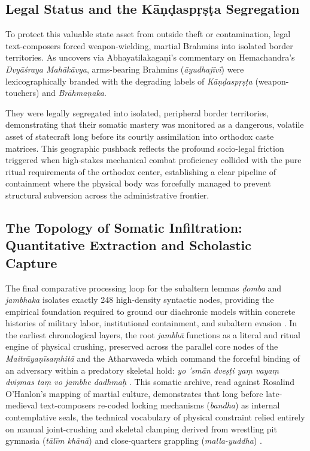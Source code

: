 \documentclass[11pt,twoside,letterpaper]{article}
\begin{document}
\subsection{Legal Status and the K\={a}\d{n}\d{d}asp\d{r}\d{s}\d{t}a Segregation}
To protect this valuable state asset from outside theft or contamination, legal text-composers forced weapon-wielding, martial Brahmins into isolated border territories. As \citet{Sandesara1948} uncovers via Abhayatilakaga\d{n}i’s commentary on Hemachandra’s \textit{Dvy\={a}\'sraya Mah\={a}k\={a}vya}, arms-bearing Brahmins (\textit{\={a}yudhaj\={i}v\={i}}) were lexicographically branded with the degrading labels of \textit{K\={a}\d{n}\d{d}asp\d{r}\d{s}\d{t}a} (weapon-touchers) and \textit{Br\={a}hma\d{n}aka}. 

They were legally segregated into isolated, peripheral border territories, demonstrating that their somatic mastery was monitored as a dangerous, volatile asset of statecraft long before its courtly assimilation into orthodox caste matrices. This geographic pushback reflects the profound socio-legal friction triggered when high-stakes mechanical combat proficiency collided with the pure ritual requirements of the orthodox center, establishing a clear pipeline of containment where the physical body was forcefully managed to prevent structural subversion across the administrative frontier.

\subsection{The Topology of Somatic Infiltration: Quantitative Extraction and Scholastic Capture}
The final comparative processing loop for the subaltern lemmas \textit{\d{d}omba} and \textit{jambhaka} isolates exactly 248 high-density syntactic nodes, providing the empirical foundation required to ground our diachronic models within concrete histories of military labor, institutional containment, and subaltern evasion \citep{Lorenzen1978, McCartneyForthcomingDomingA}. In the earliest chronological layers, the root \textit{jambh\={a}} functions as a literal and ritual engine of physical crushing, preserved across the parallel core nodes of the \textit{Maitr\={a}ya\d{n}\={i}sa\d{m}hit\={a}} and the Atharvaveda which command the forceful binding of an adversary within a predatory skeletal hold: \textit{yo ’sm\={a}n dve\d{s}\d{t}i ya\d{m} vaya\d{m} dvi\d{s}mas ta\d{m} vo jambhe dadhma\d{h}} \citep{McCartneyForthcomingDomingB}. This somatic archive, read against Rosalind O’Hanlon’s mapping of martial culture, demonstrates that long before late-medieval text-composers re-coded locking mechanisms (\textit{bandha}) as internal contemplative seals, the technical vocabulary of physical constraint relied entirely on manual joint-crushing and skeletal clamping derived from wrestling pit gymnasia (\textit{t\={a}l\={i}m kh\={a}n\={a}}) and close-quarters grappling (\textit{malla-yuddha}) \citep{Birch2024, OHanlon2007}.
\end{document}
